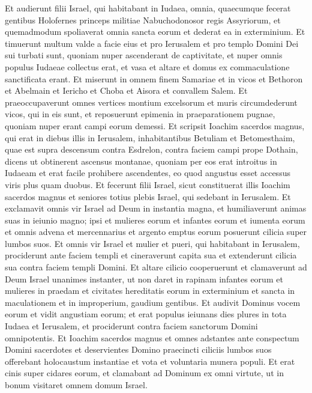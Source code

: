 \begin{biblechapter}
\begin{biblechapter}
\begin{biblechapter}
\begin{biblechapter}
\verse Et audierunt filii Israel, qui habitabant in Iudaea, omnia, quaecumque fecerat gentibus Holofernes princeps militiae Nabuchodonosor regis Assyriorum, et quemadmodum spoliaverat omnia sancta eorum et dederat ea in exterminium. 
 \verse Et timuerunt multum valde a facie eius et pro Ierusalem et pro templo Domini Dei sui turbati sunt, 
\verse quoniam nuper ascenderant de captivitate, et nuper omnis populus Iudaeae collectus erat, et vasa et altare et domus ex commaculatione sanctificata erant. 
\verse Et miserunt in omnem finem Samariae et in vicos et Bethoron et Abelmain et Iericho et Choba et Aisora et convallem Salem. 
\verse Et praeoccupaverunt omnes vertices montium excelsorum et muris circumdederunt vicos, qui in eis sunt, et reposuerunt epimenia in praeparationem pugnae, quoniam nuper erant campi eorum demessi. 
\verse Et scripsit Ioachim sacerdos magnus, qui erat in diebus illis in Ierusalem, inhabitantibus Betuliam et Betomesthaim, quae est supra descensum contra Esdrelon, contra faciem campi prope Dothain, 
\verse dicens ut obtinerent ascensus montanae, quoniam per eos erat introitus in Iudaeam et erat facile prohibere ascendentes, eo quod angustus esset accessus viris plus quam duobus. 
\verse Et fecerunt filii Israel, sicut constituerat illis Ioachim sacerdos magnus et seniores totius plebis Israel, qui sedebant in Ierusalem. 
\verse Et exclamavit omnis vir Israel ad Deum in instantia magna, et humiliaverunt animas suas in ieiunio magno; 
\verse ipsi et mulieres eorum et infantes eorum et iumenta eorum et omnis advena et mercennarius et argento emptus eorum posuerunt cilicia super lumbos suos. 
\verse Et omnis vir Israel et mulier et pueri, qui habitabant in Ierusalem, prociderunt ante faciem templi et cineraverunt capita sua et extenderunt cilicia sua contra faciem templi Domini. 
\verse Et altare cilicio cooperuerunt et clamaverunt ad Deum Israel unanimes instanter, ut non daret in rapinam infantes eorum et mulieres in praedam et civitates hereditatis eorum in exterminium et sancta in maculationem et in improperium, gaudium gentibus. 
\verse Et audivit Dominus vocem eorum et vidit angustiam eorum; et erat populus ieiunans dies plures in tota Iudaea et Ierusalem, et prociderunt contra faciem sanctorum Domini omnipotentis. 
\verse Et Ioachim sacerdos magnus et omnes adstantes ante conspectum Domini sacerdotes et deservientes Domino praecincti ciliciis lumbos suos offerebant holocaustum instantiae et vota et voluntaria munera populi. 
\verse Et erat cinis super cidares eorum, et clamabant ad Dominum ex omni virtute, ut in bonum visitaret omnem domum Israel.
 

\end{biblechapter}
\end{biblechapter}
\end{biblechapter}
\end{biblechapter}
